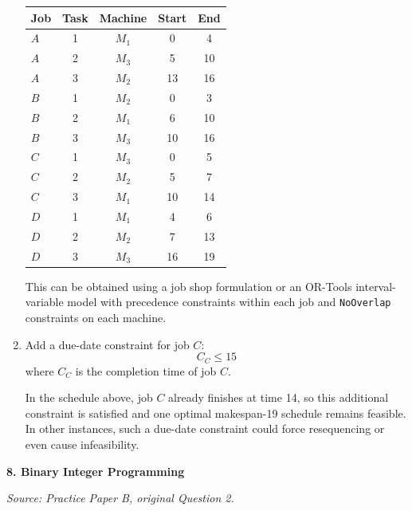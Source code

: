 \documentclass[11pt,a4paper]{article}
\begin{document}
\begin{enumerate}
\begin{center}
\begin{tabular}{lcccc}
\toprule
Job & Task & Machine & Start & End \\
\midrule
$A$ & 1 & $M_1$ & 0 & 4 \\
$A$ & 2 & $M_3$ & 5 & 10 \\
$A$ & 3 & $M_2$ & 13 & 16 \\
$B$ & 1 & $M_2$ & 0 & 3 \\
$B$ & 2 & $M_1$ & 6 & 10 \\
$B$ & 3 & $M_3$ & 10 & 16 \\
$C$ & 1 & $M_3$ & 0 & 5 \\
$C$ & 2 & $M_2$ & 5 & 7 \\
$C$ & 3 & $M_1$ & 10 & 14 \\
$D$ & 1 & $M_1$ & 4 & 6 \\
$D$ & 2 & $M_2$ & 7 & 13 \\
$D$ & 3 & $M_3$ & 16 & 19 \\
\bottomrule
\end{tabular}
\end{center}

This can be obtained using a job shop formulation or an OR-Tools interval-variable model with precedence constraints within each job and \texttt{NoOverlap} constraints on each machine.

\item Add a due-date constraint for job $C$:
\[
C_C \le 15
\]
where $C_C$ is the completion time of job $C$.

In the schedule above, job $C$ already finishes at time 14, so this additional constraint is satisfied and one optimal makespan-19 schedule remains feasible. In other instances, such a due-date constraint could force resequencing or even cause infeasibility.
\end{enumerate}

\newpage

\textbf{8. Binary Integer Programming}

\textit{Source: Practice Paper B, original Question 2.}
\end{document}
